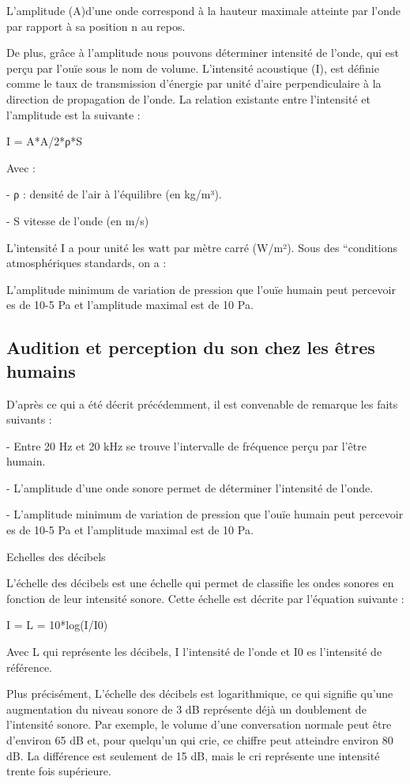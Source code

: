 \documentclass[conference,onecolumn]{IEEEtran}
\begin{document}
L'amplitude (A)d'une onde correspond à la hauteur maximale atteinte par l'onde par rapport à sa position n au repos. 

De plus, grâce à l’amplitude nous pouvons déterminer intensité de l’onde, qui est perçu par l’ouïe sous le nom de volume. L'intensité acoustique (I), est définie comme le taux de transmission d'énergie par unité d’aire perpendiculaire à la direction de propagation de l’onde. La relation existante entre l’intensité et l’amplitude est la suivante : 

 I = A*A/2*ρ*S

Avec :  

- ρ : densité de l’air à l’équilibre (en kg/m³). 

 - S vitesse de l’onde (en m/s) 

L’intensité I a pour unité les watt par mètre carré (W/m²). Sous des “conditions atmosphériques standards, on a : 

 

L’amplitude minimum de variation de pression que l’ouïe humain peut percevoir es de 10-5 Pa et l’amplitude maximal est de 10 Pa. 

\subsection{Audition et perception du son chez les êtres humains}

D’après ce qui a été décrit précédemment, il est convenable de remarque les faits suivants : 

- Entre 20 Hz et 20 kHz se trouve l’intervalle de fréquence perçu par l’être humain.  

- L’amplitude d’une onde sonore permet de déterminer l’intensité de l’onde. 

- L’amplitude minimum de variation de pression que l’ouïe humain peut percevoir es de 10-5 Pa et l’amplitude maximal est de 10 Pa. 

Echelles des décibels 

L’échelle des décibels est une échelle qui permet de classifie les ondes sonores en fonction de leur intensité sonore. Cette échelle est décrite par l’équation suivante : 

I = L = 10*log(I/I0) 

Avec L qui représente les décibels, I l’intensité de l’onde et I0 es l’intensité de référence. 

Plus précisément, L’échelle des décibels est logarithmique, ce qui signifie qu’une augmentation du niveau sonore de 3 dB représente déjà un doublement de l’intensité sonore. Par exemple, le volume d’une conversation normale peut être d’environ 65 dB et, pour quelqu’un qui crie, ce chiffre peut atteindre environ 80 dB. La différence est seulement de 15 dB, mais le cri représente une intensité trente fois supérieure. 
\end{document}
